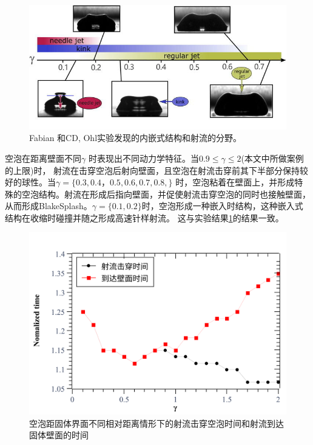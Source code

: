 \begin{figure}[h]
    \centering
    \includegraphics[width=0.7\linewidth]{img/figkink.jpeg}
    \caption[实验发现的内嵌式结构和射流的分野]{Fabian 和CD, Ohl实验发现的内嵌式结构和射流的分野\cite{reuter_supersonic_2021}。}
    \label{figkink}
\end{figure}



空泡在距离壁面不同$\gamma$ 时表现出不同动力学特征。当$0.9\leq \gamma\leq2$(本文中所做案例的上限)时， 射流在击穿空泡后射向壁面，且空泡在射流击穿前其下半部分保持较好的球性。当$\gamma=\{0.3,0.4，0.5,0.6,0.7,0.8,\}$ 时，空泡粘着在壁面上，并形成特殊的空泡结构。射流在形成后指向壁面，并促使射流击穿空泡的同时也接触壁面，从而形成BlakeSplash。$\gamma=\{0.1,0.2\}$时，空泡形成一种嵌入时结构，这种嵌入式结构在收缩时碰撞并随之形成高速针样射流。
这与实验结果\ref{figkink}\cite{reuter_supersonic_2021}的结果一致。


\begin{figure}[h]
    \centering
    \includegraphics[width=0.9\linewidth]{img/solidtime.eps.pdf}
    \caption{空泡距固体界面不同相对距离情形下的射流击穿空泡时间和射流到达固体壁面的时间}
    \label{fig3.jettime}
\end{figure}


